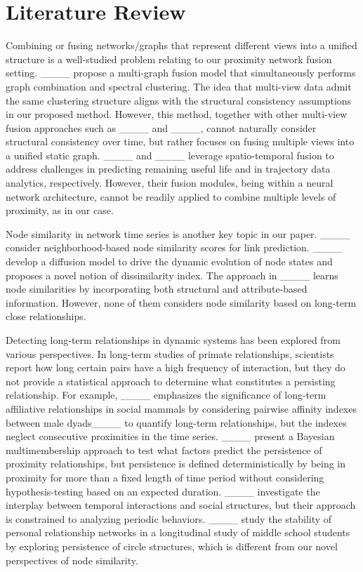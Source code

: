 \section{Literature Review}
Combining or fusing networks/graphs that represent different views into a unified structure is a well-studied problem relating to our proximity network fusion setting. ____ propose a multi-graph fusion model that simultaneously performs graph combination and spectral clustering. The idea that multi-view data admit the same clustering structure aligns with the structural consistency assumptions in our proposed method. However, this method, together with other multi-view fusion approaches such as ____ and ____, cannot naturally consider structural consistency over time, but rather focuses on fusing multiple views into a unified static graph. ____ and ____ leverage spatio-temporal fusion to address challenges in predicting remaining useful life and in trajectory data analytics, respectively. However, their fusion modules, being within a neural network architecture, cannot be readily applied to combine multiple levels of proximity, as in our case.

Node similarity in network time series is another key topic in our paper. ____ consider neighborhood-based node similarity scores for link prediction. ____ develop a diffusion model to drive the dynamic evolution of node states and proposes a novel notion of dissimilarity index. The approach in ____ learns node similarities by incorporating both structural and attribute-based information. However, none of them considers node similarity based on long-term close relationships.

Detecting long-term relationships in dynamic systems has been explored from various perspectives. In long-term studies of primate relationships, scientists report how long certain pairs have a high frequency of interaction, but they do not provide a statistical approach to determine what constitutes a persisting relationship. For example,  ____ emphasizes the significance of long-term affiliative relationships in social mammals by considering pairwise affinity indexes between male dyads____ to quantify long-term relationships, but the indexes neglect consecutive proximities in the time series. ____ present a Bayesian multimembership approach to test what factors predict the persistence of proximity relationships, but persistence is defined deterministically by being in proximity for more than a fixed length of time period without considering hypothesis-testing based on an expected duration. ____ investigate the interplay between temporal interactions and social structures, but their approach is constrained to analyzing periodic behaviors. ____ study the stability of personal relationship networks in a longitudinal study of middle school students by exploring persistence of circle structures, which is different from our novel perspectives of node similarity.

